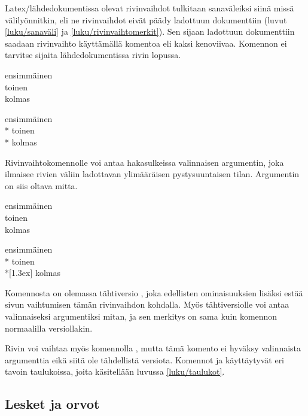Latex\-/lähdedokumentissa olevat rivinvaihdot tulkitaan sanaväleiksi
siinä missä välilyönnitkin, eli ne rivinvaihdot eivät päädy ladottuun
dokumenttiin (luvut \ref{luku/sanaväli} ja
\ref{luku/rivinvaihtomerkit}). Sen sijaan ladottuun dokumenttiin saadaan
rivinvaihto käyttämällä komentoa \komento{\keno} eli kaksi kenoviivaa.
Komennon ei tarvitse sijaita lähdedokumentissa rivin lopussa.

\komentoi{\keno}
\begin{koodilohkosis}
ensimmäinen \\ toinen \\
kolmas
\end{koodilohkosis}

\begin{tulossis}
  ensimmäinen \\* toinen \\* kolmas
\end{tulossis}

\noindent
Rivinvaihtokomennolle voi antaa hakasulkeissa valinnaisen argumentin,
joka ilmaisee rivien väliin ladottavan ylimääräisen pystysuuntaisen
tilan. Argumentin on siis oltava mitta.

\komentoi{\keno}
\begin{koodilohkosis}
ensimmäinen \\ toinen \\[1.3ex] kolmas
\end{koodilohkosis}

\begin{tulossis}
  ensimmäinen \\* toinen \\*[1.3ex] kolmas
\end{tulossis}

\noindent
Komennosta on olemassa tähtiversio \komento{\keno *}, joka edellisten
ominaisuuksien lisäksi estää sivun vaihtumisen tämän rivinvaihdon
kohdalla. Myös tähtiversiolle voi antaa valinnaiseksi argumentiksi
mitan, ja sen merkitys on sama kuin komennon normaalilla versiollakin.

Rivin voi vaihtaa myös komennolla , mutta tämä komento
ei hyväksy valinnaista argumenttia eikä siitä ole tähdellistä versiota.
Komennot  ja \komento{\keno} käyttäytyvät eri tavoin
taulukoissa, joita käsitellään luvussa \ref{luku/taulukot}.

\subsection{Lesket ja orvot}

